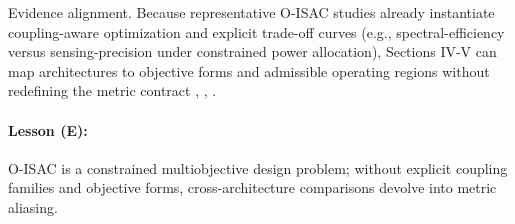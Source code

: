 Evidence alignment. Because representative O-ISAC studies already instantiate coupling-aware optimization and explicit trade-off curves (e.g., spectral-efficiency versus sensing-precision under constrained power allocation), Sections IV-V can map architectures to objective forms and admissible operating regions without redefining the metric contract \cite{O_ISAC_048}, \cite{O_ISAC_023}, \cite{O_ISAC_052}.

\paragraph{Lesson (E):} O-ISAC is a constrained multiobjective design problem; without explicit coupling families and objective forms, cross-architecture comparisons devolve into metric aliasing.
